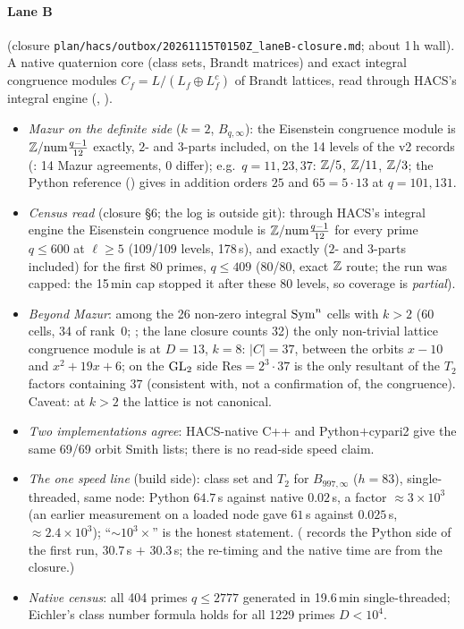 \paragraph{Lane B} (closure \texttt{plan/hacs/outbox/20261115T0150Z\_laneB-closure.md}; about 1\,h wall). A native
quaternion core (class sets, Brandt matrices) and exact integral congruence modules $C_f=L/(L_f\oplus L_f^c)$ of Brandt
lattices, read through HACS's integral engine (, ).
\begin{itemize}
\item \emph{Mazur on the definite side} ($k=2$, $B_{q,\infty}$): the Eisenstein congruence module is $\mathbb{Z}/\mathrm{num}\frac{q-1}{12}$
  exactly, $2$- and $3$-parts included, on the 14 levels of the v2 records (: 14 Mazur
  agreements, 0 differ); e.g.\ $q=11,23,37$: $\mathbb{Z}/5$, $\mathbb{Z}/11$, $\mathbb{Z}/3$; the Python reference ()
  gives in addition orders $25$ and $65=5\cdot13$ at $q=101,131$.
\item \emph{Census read} (closure \S6; the log is outside git): through HACS's integral engine the Eisenstein congruence module
  is $\mathbb{Z}/\mathrm{num}\frac{q-1}{12}$ for every prime $q\le600$ at $\ell\ge5$ (109/109 levels, 178\,s), and exactly
  ($2$- and $3$-parts included) for the first 80 primes, $q\le409$ (80/80, exact $\mathbb{Z}$ route; the run was capped: the
  15\,min cap stopped it after these 80 levels, so coverage is \emph{partial}).
\item \emph{Beyond Mazur}: among the 26 non-zero integral $\mathrm{Sym}^n$ cells with $k>2$ (60 cells, 34 of rank~$0$; ;
  the lane closure counts 32) the only non-trivial lattice congruence module is at
  $D=13$, $k=8$: $|C|=37$, between the orbits $x-10$ and $x^2+19x+6$; on the $\mathrm{GL}_2$ side $\mathrm{Res}=2^3\cdot37$ is the
  only resultant of the $T_2$ factors containing $37$ (consistent with, not a confirmation of, the congruence). Caveat:
  at $k>2$ the lattice is not canonical.
\item \emph{Two implementations agree}: HACS-native C++ and Python$+$cypari2 give the same 69/69 orbit Smith lists; there is no
  read-side speed claim.
\item \emph{The one speed line} (build side): class set and $T_2$ for $B_{997,\infty}$ ($h=83$), single-threaded, same node:
  Python $64.7$\,s against native $0.02$\,s, a factor $\approx3\times10^3$ (an earlier measurement on a loaded node gave
  $61$\,s against $0.025$\,s, $\approx2.4\times10^3$); ``$\sim10^3\times$'' is the honest statement. (
  records the Python side of the first run, $30.7$\,s $+$ $30.3$\,s; the re-timing and the native time are from the closure.)
\item \emph{Native census}: all 404 primes $q\le2777$ generated in 19.6\,min single-threaded; Eichler's class number formula holds
  for all 1229 primes $D<10^4$.
\end{itemize}
